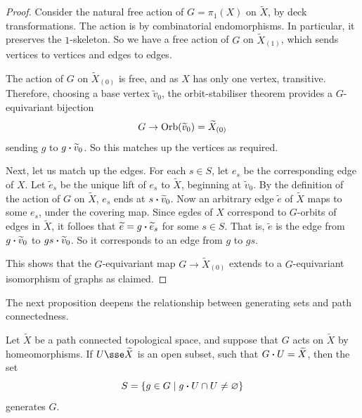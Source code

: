 \documentclass{article}
\begin{document}
\lec

\begin{proof}
    Consider the natural free action of \(G = \pi_1(X)\) on \(\widetilde X\), by deck transformations. The action is by combinatorial endomorphisms. In particular, it preserves the \(1\)-skeleton. So we have a free action of \(G\) on \(\widetilde{X}_{(1)}\), which sends vertices to vertices and edges to edges.

    The action of \(G\) on \(\widetilde X_{(0)}\) is free, and as \(X\) has only one vertex, transitive. Therefore, choosing a base vertex \(\widetilde v_0\), the orbit-stabiliser theorem provides a \(G\)-equivariant bijection
    \[G \to \operatorname{Orb}(\widetilde v_0) = \widetilde{X}_{(0)}\]
    sending \(g\) to \(g\vdot \widetilde v_0\). So this matches up the vertices as required.

    Next, let us match up the edges. For each \(s \in S\), let \(e_s\) be the corresponding edge of \(X\). Let \(\widetilde e_s\) be the unique lift of \(e_s\) to \(\widetilde{X}\), beginning at \(\widetilde v_0\). By the definition of the action of \(G\) on \(\widetilde{X}\), \(e_s\) ends at \(s \vdot \widetilde v_0\). Now an arbitrary edge \(\widetilde e\) of \(\widetilde X\) maps to some \(e_s\), under the covering map. Since egdes of \(X\) correspond to \(G\)-orbits of edges in \(\widetilde X\), it folloes that \(\widetilde e = g \vdot \widetilde e_s\) for some \(s \in S\). That is, \(\widetilde e\) is the edge from \(g\vdot \widetilde v_0\) to \(gs \vdot \widetilde v_0\). So it corresponds to an edge from \(g\) to \(gs\).

    This shows that the \(G\)-equivariant map \(G \to \widetilde{X}_{(0)}\) extends to a \(G\)-equivariant isomorphism of graphs as claimed.
\end{proof}

The next proposition deepens the relationship between generating sets and path connectedness.

\begin{proposition}
    Let \(\widetilde X\) be a path connected topological space, and suppose that \(G\) acts on \(\widetilde X\) by homeomorphisms. If \(U \sse \widetilde X\) is an open subset, such that \(G \vdot U = \widetilde X\), then the set
    \[S = \{g \in G \mid g\vdot U \cap U \ne \emptyset\}\]
    generates \(G\).
\end{proposition}
\end{document}
